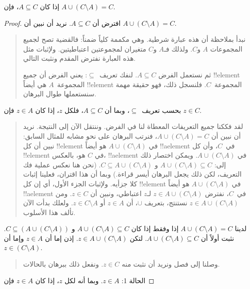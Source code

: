 \documentclass[../../../include/open-logic-section]{subfiles}
\begin{document}


\begin{prop}
إذا كان $A \subseteq C$، فإن $A \cup (C \setminus A) = C$.
\end{prop}

\begin{proof}
  افترض أن $A \subseteq C$. نريد أن نبين أن
  $A \cup (C \setminus A) = C$.
  \begin{quote}
    نبدأ بملاحظة أن هذه عبارة شرطية. وهي مكممة كلياً ضمناً: فالقضية تصح
    لجميع المجموعات $A$ و$C$. ولذلك فـ$A$ و$C$ متغيران لمجموعتين
    اعتباطيتين. ولإثبات مثل هذه العبارة نفترض المقدم ونثبت التالي.

    ثم نستعمل الفرض $A \subseteq C$. لنفك تعريف~$\subseteq$: يعني
    الفرض أن جميع !!{element} المجموعة~$A$ هي أيضاً !!{element}
    المجموعة~$C$. فلنسجل ذلك، فهو حقيقة مهمة سنستعملها طوال البرهان.
  \end{quote}
  بحسب تعريف~$\subseteq$، وبما أن $A \subseteq C$، فلكل $z$، إذا كان
  $z \in A$ فإن $z \in C$.
  \begin{quote}
    لقد فككنا جميع التعريفات المعطاة لنا في الفرض. وننتقل الآن إلى
    النتيجة. نريد أن نبين أن $A \cup (C \setminus A) = C$، فنرتب
    البرهان على نحو مشابه للمثال السابق: نبين أن كل !!{element} في
    $A \cup (C \setminus A)$ هو أيضاً !!a{element} في~$C$، وأن كل
    !!{element} في $C$ هو، بالعكس، !!a{element} في
    $A \cup (C \setminus A)$. ويمكن اختصار ذلك إلى:
    $A \cup (C \setminus A) \subseteq C$ و
    $C \subseteq A \cup (C \setminus A)$. (نحن هنا نعكس عملية فك
    التعريف، لكن ذلك يجعل البرهان أيسر قراءة.) وبما أن هذا اقتران، فعلينا
    إثبات كلا جزأيه. ولإثبات الجزء الأول، أي إن كل !!{element} في
    $A \cup (C \setminus A)$ هو أيضاً !!a{element} في~$C$، نفترض
    $z \in A \cup (C \setminus A)$ لـ$z$ اعتباطي، ونبين أن
    $z \in C$. ومن $z \in A \cup (C \setminus A)$ نستنتج، بتعريف
    $\cup$، أن $z \in A$ أو $z \in C \setminus A$. ولعلك بدأت الآن
    تألف هذا الأسلوب.
    \end{quote}
  لدينا $A \cup (C \setminus A) = C$ إذا وفقط إذا كان
  $A \cup (C \setminus A) \subseteq C$ و
  $C \subseteq (A \cup (C \setminus A))$. نثبت أولاً أن
  $A \cup (C \setminus A) \subseteq C$. لتكن
  $z \in A \cup (C \setminus A)$. إذن إما أن $z \in A$ وإما أن
  $z \in (C \setminus A)$.
  \begin{quote}
    وصلنا إلى فصل ونريد أن نثبت منه $z \in C$. ونفعل ذلك ببرهان
    بالحالات.
  \end{quote}
  الحالة 1: $z \in A$. وبما أنه لكل $z$، إذا كان $z \in A$ فإن

\end{proof}
\end{document}
